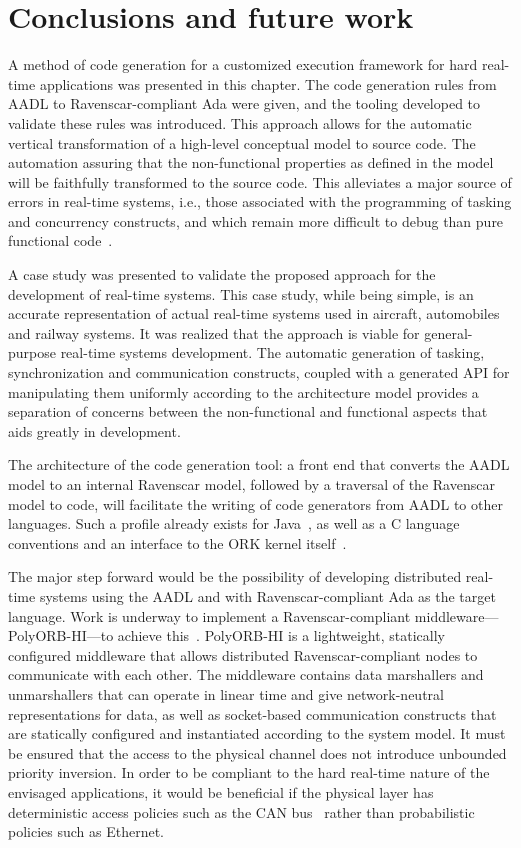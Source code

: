 \section{Conclusions and future work}
A method of code generation for a customized execution framework for
hard real-time applications was presented in this chapter. The code
generation rules from AADL to Ravenscar-compliant Ada were given, and
the tooling developed to validate these rules was introduced. This
approach allows for the automatic vertical transformation of a
high-level conceptual model to source code. The automation assuring
that the non-functional properties as defined in the model will be
faithfully transformed to the source code. This alleviates a major
source of errors in real-time systems, i.e., those associated with the
programming of tasking and concurrency constructs, and which remain
more difficult to debug than pure functional code~\cite{schulz@issta00}.

A case study was presented to validate the proposed approach for the
development of real-time systems. This case study, while being simple,
is an accurate representation of actual real-time systems used in
aircraft, automobiles and railway systems. It was realized that the
approach is viable for general-purpose real-time systems
development. The automatic generation of tasking, synchronization and
communication constructs, coupled with a generated API for
manipulating them uniformly according to the architecture model
provides a separation of concerns between the non-functional
and functional aspects that aids greatly in development.

The architecture of the code generation tool: a front end that
converts the AADL model to an internal Ravenscar model, followed by a
traversal of the Ravenscar model to code, will facilitate the writing
of code generators from AADL to other languages. Such a profile
already exists for Java~\cite{kwon@jgi02}, as well as a C language
conventions and an interface to the ORK kernel
itself~\cite{upm-ork-manual}. 

The major step forward would be the possibility of developing
distributed real-time systems using the AADL and with
Ravenscar-compliant Ada as the target language. Work is underway to
implement a Ravenscar-compliant middleware---PolyORB-HI---to achieve
this~\cite{zalila@ae07}. PolyORB-HI is a lightweight, statically
configured middleware that allows distributed Ravenscar-compliant
nodes to communicate with each other. The middleware contains data
marshallers and unmarshallers that can operate in linear time and give
network-neutral representations for data, as well as socket-based
communication constructs that are statically configured and
instantiated according to the system model. It must be ensured that
the access to the physical channel does not introduce unbounded
priority inversion. In order to be compliant to the hard real-time
nature of the envisaged applications, it would be beneficial if the
physical layer has deterministic access policies such as the CAN
bus~\cite{davis@rts07} rather than probabilistic policies such as
Ethernet.


